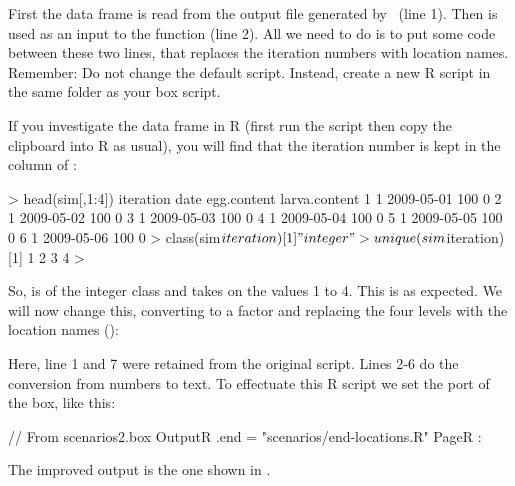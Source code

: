 First the  data frame is read from the output file generated by \US\ (line 1). Then  is used as an input to the  function (line 2). All we need to do is to put some code between these two lines, that replaces the iteration numbers with location names. Remember: Do not change the default  script. Instead, create a new R script in the same folder as your box script.

If you investigate the  data frame in R (first run the  script then copy the clipboard into R as usual), you will find that the iteration number is kept in the  column of :

\begin{rdialog}
> head(sim[,1:4])
  iteration       date egg.content larva.content
1         1 2009-05-01         100             0
2         1 2009-05-02         100             0
3         1 2009-05-03         100             0
4         1 2009-05-04         100             0
5         1 2009-05-05         100             0
6         1 2009-05-06         100             0
> class(sim$iteration)
[1] "integer"
> unique(sim$iteration)
[1] 1 2 3 4
> 
\end{rdialog}

So,  is of the integer class and takes on the values 1 to 4. This is as expected. We will now change this, converting  to a factor and replacing the four levels with the location names ():
\lstset{numbers=left}
\lstset{numbers=none}

Here, line 1 and 7 were retained from the original  script. Lines 2-6 do the conversion from numbers to text. To effectuate this R script we set the  port of the  box, like this:

\begin{boxscript}
// From scenarios2.box
OutputR {
  .end = "scenarios/end-locations.R"
  PageR {
  :
  }
}
\end{boxscript}

The improved output is the one shown in .


